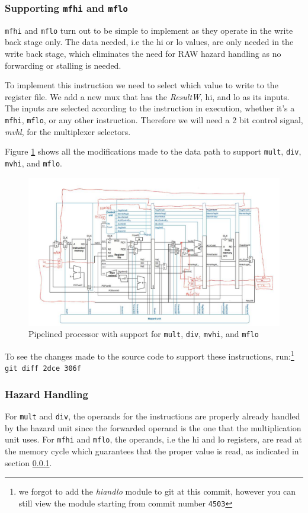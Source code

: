\documentclass[titlepage,12pt,oneside,a4paper]{article}
\newcommand{\code}[1]{{\texttt{#1}}}
\begin{document}
\subsubsection{Supporting \code{mfhi} and \code{mflo}}
\label{mfhl}
\code{mfhi} and \code{mflo} turn out to be simple to implement as they operate in the write back stage only. The data needed, i.e the hi or lo values, are only needed in the write back stage, which eliminates the need for RAW hazard handling as no forwarding or stalling is needed.

To implement this instruction we need to select which value to write to the register file. We add a new mux that has the \textit{ResultW}, hi, and lo as its inputs. The inputs are selected according to the instruction in execution, whether it's a \code{mfhi}, \code{mflo}, or any other instruction. Therefore we will need a 2 bit control signal, \textit{mvhl}, for the multiplexer selectors.

Figure \ref{fig:mdhl} shows all the modifications made to the data path to support \code{mult}, \code{div}, \code{mvhi}, and \code{mflo}.

\begin{figure}
	\includegraphics[width=\textwidth]{mdhl.jpeg}
	\centering
	\caption{Pipelined processor with support for \code{mult}, \code{div}, \code{mvhi}, and \code{mflo}}
	\label{fig:mdhl}
\end{figure}
 To see the changes made to the source code to support these instructions, run:\footnote{we forgot to add the \textit{hiandlo } module to git at this commit, however you can still view the module starting from commit number \code{4503}}\\
 \code{git diff 2dce 306f} 

\subsubsection{Hazard Handling}
For \code{mult} and \code{div}, the operands for the instructions are properly already handled by the hazard unit since the forwarded operand is the one that the multiplication unit uses. For \code{mfhi} and \code{mflo}, the operands, i.e the hi and lo registers, are read at the memory cycle which guarantees that the proper value is read, as indicated in section \ref{mfhl}.
\end{document}
